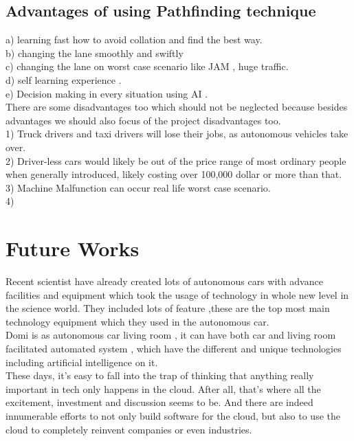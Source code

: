 \documentclass[conference]{IEEEtran}
\begin{document}
\subsection{Advantages of using Pathfinding technique}
a) learning fast how to avoid collation and find the best way.\\
b) changing the lane smoothly and swiftly\\
c) changing the lane on worst case scenario like JAM , huge traffic.\\
d) self learning experience . \\
e) Decision making in every situation using AI . \\
There are some disadvantages too which should not be neglected because besides advantages we should also focus of the project disadvantages too.\\
1) Truck drivers and taxi drivers will lose their jobs, as autonomous vehicles take over.\\ 
2) Driver-less cars would likely be out of the price range of most ordinary people when generally introduced, likely costing over 100,000 dollar or more than that.\\
3) Machine Malfunction can occur real life worst case scenario.\\
4)
\section{Future Works}
Recent scientist have already created lots of autonomous cars  with advance facilities and equipment which took the usage of technology in whole new level in the science world. They included lots of feature ,these are the top most main technology equipment which they used in the autonomous car.\\
Domi is as autonomous car living room , it can have both car and living room facilitated automated system , which have the different and unique technologies including artificial intelligence on it.\\
These days, it’s easy to fall into the trap of thinking that anything really important in tech only happens in the cloud. After all, that’s where all the excitement, investment and discussion seems to be. And there are indeed innumerable efforts to not only build software for the cloud, but also to use the cloud to completely reinvent companies or even industries.\\
\end{document}
